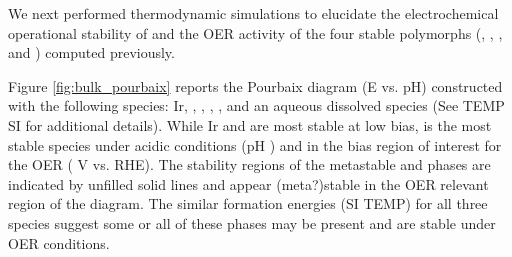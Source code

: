 %


We next performed  thermodynamic simulations to elucidate the electrochemical operational stability of \IrOx and the OER activity of the four stable polymorphs (\rIrOtwo, \aIrOthree, \rIrOthree, and \bIrOthree) computed previously.


%
%
Figure \ref{fig:bulk_pourbaix} reports the \IrOx Pourbaix diagram (E vs. pH) constructed with the following species: Ir, \rIrOtwo, \aIrOthree,  \rIrOthree, \bIrOthree, and an aqueous dissolved  species (See TEMP SI for additional details).
%
While Ir and \rIrOtwo are most stable at low bias, \aIrOthree is the most stable species under acidic conditions (pH ) and in the bias region of interest for the OER ( V vs. RHE).
%
%
The stability regions of the metastable \rIrOthree and \bIrOthree phases are indicated by unfilled solid lines and appear (meta?)stable in the OER relevant region of the diagram.
%
The similar formation energies (SI TEMP) for all three \IrOthree species suggest some or all of these \IrOthree phases may be present and are stable under OER conditions.

